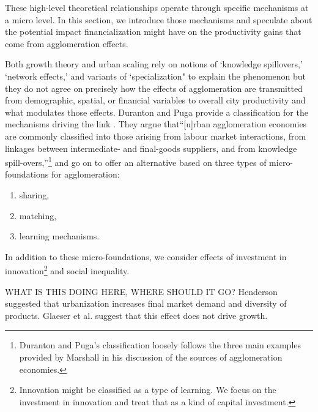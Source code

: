 These high-level theoretical relationships operate through specific mechanisms at a micro level. In this section, we introduce those mechanisms and speculate about the potential impact financialization might have on the productivity gains that come from agglomeration effects.

Both growth theory and urban scaling rely on %
notions of `knowledge spillovers,' `network effects,' and variants of `specialization" to explain the phenomenon but they do not agree on precisely how the effects of agglomeration are transmitted from demographic, spatial, or financial variables to overall city productivity and what modulates those effects. Duranton and Puga %
provide a classification for the mechanisms driving the link \cite{durantonMicroFoundationsUrbanAgglomeration2004}.  They argue that``[u]rban agglomeration economies are commonly classified into those arising from labour market interactions, from linkages between intermediate- and final-goods suppliers, and from knowledge spill-overs,''\footnote{Duranton and Puga's classification loosely follows the three main examples provided by Marshall \cite{marshallPrinciplesEconomics1890} in his discussion of the sources of agglomeration economies.} and go on to offer an alternative based on three types of micro-foundations for agglomeration:
\begin{enumerate}
\item sharing,
\item matching, 
\item learning mechanisms.
\end{enumerate}
In addition to these micro-foundations, we consider effects of investment in innovation\footnote{Innovation might be classified as a type of learning. We focus on the investment in innovation and treat that as a kind of capital investment.} and social inequality.

 WHAT IS THIS DOING HERE, WHERE SHOULD IT GO? Henderson \cite{Henderson1972Sizes} suggested that urbanization increases final market demand and diversity of products. Glaeser et al. \cite{glaeserGrowthCities1991a} suggest that this effect does not drive growth. 
 
